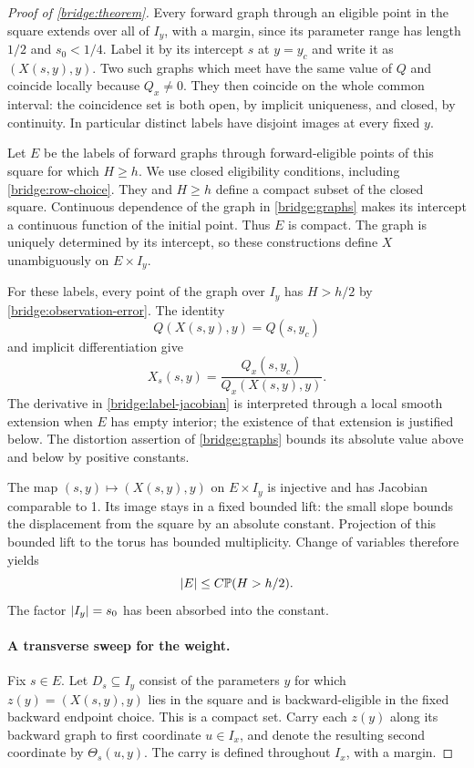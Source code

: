 \begin{proof}[Proof of \cref{bridge:theorem}]
Every forward graph through an eligible point in the square extends
over all of $I_y$, with a margin, since its parameter range has length
$1/2$ and $s_0<1/4$. Label it by its intercept $s$ at $y=y_c$ and
write it as $(X(s,y),y)$. Two such graphs which meet have the same
value of $Q$ and coincide locally because $Q_x\ne0$. They then
coincide on the whole common interval: the coincidence set is both
open, by implicit uniqueness, and closed, by continuity. In
particular distinct labels have disjoint images at every fixed $y$.

Let $E$ be the labels of forward graphs through forward-eligible
points of this square for which $H\geq h$. We use closed eligibility
conditions, including \cref{bridge:row-choice}. They and $H\geq h$
define a compact subset of the closed square. Continuous dependence
of the graph in \cref{bridge:graphs} makes its intercept a continuous
function of the initial point. Thus $E$ is compact. The graph is
uniquely determined by its intercept, so these constructions define
$X$ unambiguously on $E\times I_y$.

For these labels, every point of the graph over $I_y$ has $H>h/2$ by
\cref{bridge:observation-error}. The identity
\[
 Q(X(s,y),y)=Q(s,y_c)
\]
and implicit differentiation give
\begin{equation}
 X_s(s,y)=\frac{Q_x(s,y_c)}{Q_x(X(s,y),y)}.
 \label{bridge:label-jacobian}
\end{equation}
The derivative in \cref{bridge:label-jacobian} is interpreted through
a local smooth extension when $E$ has empty interior; the existence
of that extension is justified below. The distortion assertion of
\cref{bridge:graphs} bounds its absolute value above and below by
positive constants.

The map $(s,y)\mapsto(X(s,y),y)$ on $E\times I_y$ is injective and
has Jacobian comparable to 1. Its image stays in a fixed bounded
lift: the small slope bounds the displacement from the square by an
absolute constant. Projection of this bounded lift to the torus has
bounded multiplicity. Change of variables therefore yields
\begin{equation}
 \left\lvert E\right\rvert\leq C\mathbb{P}(H>h/2).
 \label{bridge:label-area}
\end{equation}
The factor $\left\lvert I_y\right\rvert=s_0$ has been absorbed into the constant.

\paragraph{A transverse sweep for the weight.}
Fix $s\in E$. Let $D_s\subseteq I_y$ consist of the parameters $y$
for which $z(y)=(X(s,y),y)$ lies in the square and is backward-eligible
in the fixed backward endpoint choice. This is a compact set. Carry
each $z(y)$ along its backward graph to first coordinate $u\in I_x$,
and denote the resulting second coordinate by $\Theta_s(u,y)$.
The carry is defined throughout $I_x$, with a margin.


\end{proof}
